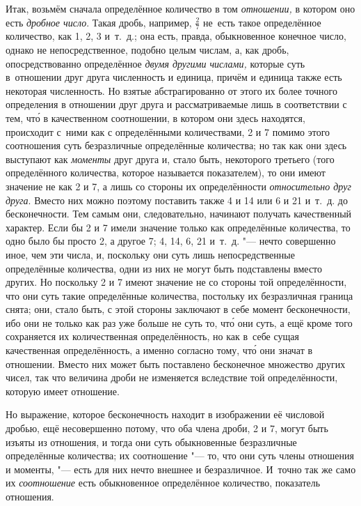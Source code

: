Итак, возьмём сначала определённое количество в том {\em отношении,} в котором
оно есть {\em дробное число}. Такая дробь, например, $\frac 2 7$ не~есть такое
определённое количество, как 1, 2, 3 и~т.~д.; она есть, правда, обыкновенное
конечное число, однако не непосредственное, подобно целым числам, а, как дробь,
опосредствованно определённое {\em двумя другими числами,} которые суть
в~отношении друг друга численность и единица, причём и единица также есть
некоторая численность. Но взятые абстрагированно от этого их более точного
определения в отношении друг друга и рассматриваемые лишь в соответствии с тем,
чт\'{о} в качественном соотношении, в котором они здесь находятся, происходит
с~ними как с определёнными количествами, 2 и 7 помимо этого соотношения суть
безразличные определённые количества; но так как они здесь выступают как
{\em моменты} друг друга и, стало быть, некоторого третьего (того определённого
количества, которое называется показателем), то они имеют значение не как 2 и
7, а лишь со стороны их определённости {\em относительно друг друга}. Вместо них
можно поэтому поставить также 4 и 14 или 6 и 21 и~т.~д. до бесконечности. Тем
самым они, следовательно, начинают получать качественный характер. Если бы 2 и 7
имели значение только как определённые количества, то одно было бы просто
2, а другое 7; 4, 14, 6, 21 и~т.~д. "--- нечто
совершенно иное, чем эти числа, и, поскольку они суть лишь
непосредственные определённые количества, одни из них не могут быть подставлены
вместо других. Но поскольку 2 и 7 имеют значение не со стороны той
определённости, что они суть такие определённые количества, постольку их
безразличная граница снята; они, стало быть, с этой стороны заключают в себе
момент бесконечности, ибо они не только как раз уже больше не суть то, чт\'{о}
они суть, а ещё кроме того сохраняется их количественная определённость, но как
в~себе сущая качественная определённость, а именно согласно тому, чт\'{о} они
значат в отношении. Вместо них может быть поставлено бесконечное множество
других чисел, так что величина дроби не изменяется вследствие той
определённости, которую имеет отношение.

Но выражение, которое бесконечность находит в изображении её числовой дробью,
ещё несовершенно потому, что оба члена дроби, 2 и 7, могут быть изъяты из
отношения, и тогда они суть обыкновенные безразличные определённые количества;
их соотношение "--- то, что они суть члены отношения и моменты, "--- есть
для них нечто внешнее и безразличное. И~точно так же само их {\em соотношение}
есть обыкновенное определённое количество, показатель отношения.

